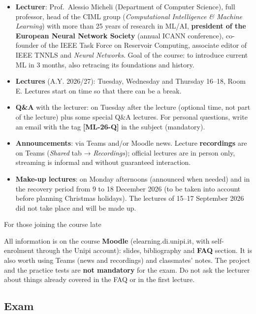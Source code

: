 \begin{itemize}
\tightlist
\item
  \textbf{Lecturer}: Prof.~Alessio Micheli (Department of Computer
  Science), full professor, head of the CIML group
  (\emph{Computational Intelligence \& Machine Learning}) with more
  than 25 years of research in ML/AI, \textbf{president of the European
  Neural Network Society} (annual ICANN conference), co-founder of the
  IEEE Task Force on Reservoir Computing, associate editor of IEEE TNNLS
  and \emph{Neural Networks}. Goal of the course: to introduce current
  ML in 3 months, also retracing its foundations and history.
\item
  \textbf{Lectures} (A.Y. 2026/27): Tuesday, Wednesday and Thursday
  16--18, Room E. Lectures start on time so that there can be a break.
\item
  \textbf{Q\&A} with the lecturer: on Tuesday after the lecture
  (optional time, not part of the lecture) plus some special Q\&A
  lectures. For personal questions, write an email with the tag
  \textbf{{[}ML-26-Q{]}} in the subject (mandatory).
\item
  \textbf{Announcements}: via Teams and/or Moodle news. Lecture
  \textbf{recordings} are on Teams (\emph{Shared} tab →
  \emph{Recordings}); official lectures are in person only, streaming
  is informal and without guaranteed interaction.
\item
  \textbf{Make-up lectures}: on Monday afternoons (announced when
  needed) and in the recovery period from 9 to 18 December 2026 (to be
  taken into account before planning Christmas holidays). The lectures
  of 15--17 September 2026 did not take place and will be made up.
\end{itemize}

\begin{boxnote}{For those joining the course late}

All information is on the course \textbf{Moodle}
(elearning.di.unipi.it, with self-enrolment through the Unipi account):
slides, bibliography and \textbf{FAQ} section. It is also worth using
Teams (news and recordings) and classmates' notes. The project and the
practice tests are \textbf{not mandatory} for the exam. Do not ask the
lecturer about things already covered in the FAQ or in the first
lecture.

\end{boxnote}

\subsection{Exam}\label{esame}

